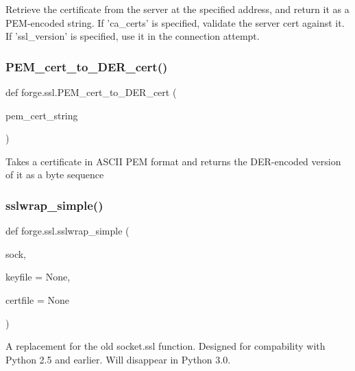 \begin{DoxyVerb}Retrieve the certificate from the server at the specified address,
and return it as a PEM-encoded string.
If 'ca_certs' is specified, validate the server cert against it.
If 'ssl_version' is specified, use it in the connection attempt.\end{DoxyVerb}
 \mbox{\label{namespaceforge_1_1ssl_a34b5820befc677dcbed74bd790165cf9}} 
\subsubsection{\texorpdfstring{P\+E\+M\+\_\+cert\+\_\+to\+\_\+\+D\+E\+R\+\_\+cert()}{PEM\_cert\_to\_DER\_cert()}}
{\footnotesize\ttfamily def forge.\+ssl.\+P\+E\+M\+\_\+cert\+\_\+to\+\_\+\+D\+E\+R\+\_\+cert (\begin{DoxyParamCaption}\item[{}]{pem\+\_\+cert\+\_\+string }\end{DoxyParamCaption})}

\begin{DoxyVerb}Takes a certificate in ASCII PEM format and returns the
DER-encoded version of it as a byte sequence\end{DoxyVerb}
 \mbox{\label{namespaceforge_1_1ssl_af156eb492f2b672e7e030e7e3deb2024}} 
\subsubsection{\texorpdfstring{sslwrap\+\_\+simple()}{sslwrap\_simple()}}
{\footnotesize\ttfamily def forge.\+ssl.\+sslwrap\+\_\+simple (\begin{DoxyParamCaption}\item[{}]{sock,  }\item[{}]{keyfile = {\ttfamily None},  }\item[{}]{certfile = {\ttfamily None} }\end{DoxyParamCaption})}

\begin{DoxyVerb}A replacement for the old socket.ssl function.  Designed
for compability with Python 2.5 and earlier.  Will disappear in
Python 3.0.\end{DoxyVerb}
 \mbox{\label{namespaceforge_1_1ssl_a1cce48a9d7c26cd4e273e092e8a7e988}} 
